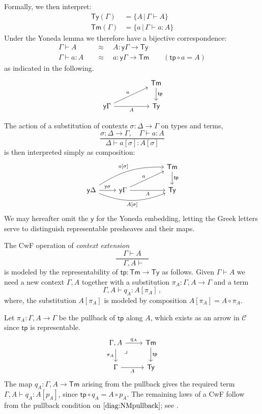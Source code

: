 \documentclass[12pt,reqno]{amsart}
\newcommand{\CC}{\ensuremath{\mathcal{C}}}
\newcommand{\y}{\ensuremath{\mathsf{y}}} %
\newcommand{\tp}{\ensuremath{\mathsf{tp}}}
\newcommand{\Tm}{\ensuremath{\mathsf{Tm}}}
\newcommand{\Ty}{\ensuremath{\mathsf{Ty}}}
\renewcommand{\to}{\ensuremath{\rightarrow}}
\newcommand{\G}{\ensuremath{\Gamma}}
\newcommand{\terms}[2]{#1 \vdash #2}
\newcommand{\Gterms}[1]{\terms{\Gamma}{#1}}
\newcommand{\ext}[2]{{#1,#2}}
\newcommand{\pbcorner}{\arrow[dr,phantom,"\lrcorner" very near start, shift right=.5ex]} %
\theoremstyle{remark}
\theoremstyle{definition}
\begin{document}
Formally, we then interpret:
\begin{align*}
 \Ty(\Gamma) &= \{ A \,|\, \Gamma \vdash A\} \\
 \Tm(\Gamma) &= \{ a \,|\, \Gamma \vdash a:A\} 
\end{align*}
Under the Yoneda lemma we therefore have a bijective correspondence:
\begin{align*}
\Gamma\vdash A\quad &\approx\quad A : \y{\Gamma}\to \Ty  \\
\Gterms{a:A}\quad &\approx\quad  a: \y{\Gamma}\to \Tm  \qquad (\tp\circ a = A)
\end{align*}
as indicated in the following.
\[
\begin{tikzcd}
 	&&  {\Tm} \ar[d,"{\tp}"]\\
\y\Gamma \ar[rru, "a"]   \ar[rr ,swap,  "A"]   && {\Ty}
\end{tikzcd}
\]
%

The action of a substitution of contexts $\sigma : \Delta \to \Gamma$ on types and terms,
\[
\frac{\sigma: \Delta \to \Gamma, \quad \Gamma\vdash a:A}{\Delta\vdash a[\sigma] : A[\sigma]}
\]
is then interpreted simply as composition:
\[
\begin{tikzcd}
 	&&&  {\Tm} \ar[d,"{\tp}"]\\
\y{\Delta} \ar[r,  "\y{\sigma}"] \ar[rrru, bend left = 4ex, "{a[\sigma]}"] \ar[rrr, swap, bend right = 5ex, "{A[\sigma]}"] & \y\Gamma \ar[rru, "a"]   \ar[rr ,swap,  "A"]  && {\Ty}
\end{tikzcd}
\]
%
We may hereafter omit the $\y$ for the Yoneda embedding, letting the Greek letters serve to distinguish representable presheaves and their maps.

The CwF operation of \emph{context extension} 
$$\frac{\quad\Gamma\vdash A\quad}{\ \ \ext{\G}{A}\vdash}$$
is modeled by the representability of $\tp : \Tm\to\Ty$ as follows.
%
Given $\Gamma\vdash A$ we need a new context $\ext{\G}{A}$ together with a substitution $\pi_A : \ext{\G}{A} \to \G$ and a term 
\[
\terms{\ext{\G}{A}}{q_A:A[\pi_A]}\,,
\]
where, the substitution $A[\pi_A]$ is modeled by composition $A[\pi_A] = A\circ \pi_A$.

Let $\pi_A: \ext{\G}{A} \to \G$ be the pullback of $\tp$ along $A$, which exists as an arrow in $\CC$ since $\tp$ is representable.
%
\begin{equation}\label{diag:NMpullback}
\begin{tikzcd}
{\ext{\G}{A}} \ar[d,swap, "{\pi_A}"] \ar[r, "{q_A}"] \pbcorner &  {\Tm} \ar[d, "{\tp}"]\\
{\G} \ar[r,swap,"A"]   & {\Ty}
\end{tikzcd}
\end{equation}
%
The map $q_A : \ext{\G}{A}\to\Tm$ arising from the pullback gives the required term $\terms{\ext{\G}{A}}{q_A:A[p_A]}$, since $\tp\circ q_A = A \circ p_A$.
The remaining laws of a CwF follow from the pullback condition on $\eqref{diag:NMpullback}$; see \cite{awodey:NM}.
\end{document}
